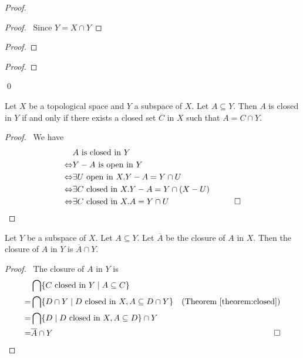 \begin{proof}
    \pf
    \begin{proof}
        \pf\ Since $Y = X \cap Y$
    \end{proof}
    \begin{proof}
    \end{proof}
    \begin{proof}
    \end{proof}
    \qed
\end{proof}

\begin{theorem}
    \label{theorem:closed}
    Let $X$ be a topological space and $Y$ a subspace of $X$. Let $A \subseteq Y$. Then $A$ is closed in $Y$
    if and only if there exists a closed set $C$ in $X$ such that $A = C \cap Y$.
\end{theorem}

\begin{proof}
    \pf\ 
    We have
    \begin{align*}
        & A \text{ is closed in } Y \\
        \Leftrightarrow & Y - A \text{ is open in } Y \\
        \Leftrightarrow & \exists U \text{ open in } X. Y - A = Y \cap U \\
        \Leftrightarrow & \exists C \text{ closed in } X. Y - A = Y \cap (X - U) \\
        \Leftrightarrow & \exists C \text{ closed in } X. A = Y \cap U & \qed
    \end{align*}
\end{proof}

\begin{theorem}
    Let $Y$ be a subspace of $X$. Let $A \subseteq Y$. Let $\overline{A}$ be the closure of $A$ in $X$.
    Then the closure of $A$ in $Y$ is $\overline{A} \cap Y$.
\end{theorem}

\begin{proof}
    \pf\ The closure of $A$ in $Y$ is
    \begin{align*}
        & \bigcap \{ C \text{ closed in } Y \mid A \subseteq C \} \\
        = & \bigcap \{ D \cap Y \mid D \text{ closed in } X, A \subseteq D \cap Y \} 
            & (\text{Theorem \ref{theorem:closed}})\\
        = & \bigcap \{ D \mid D \text{ closed in } X, A \subseteq D \} \cap Y \\
        = & \overline{A} \cap Y & \qed
    \end{align*}
\end{proof}

